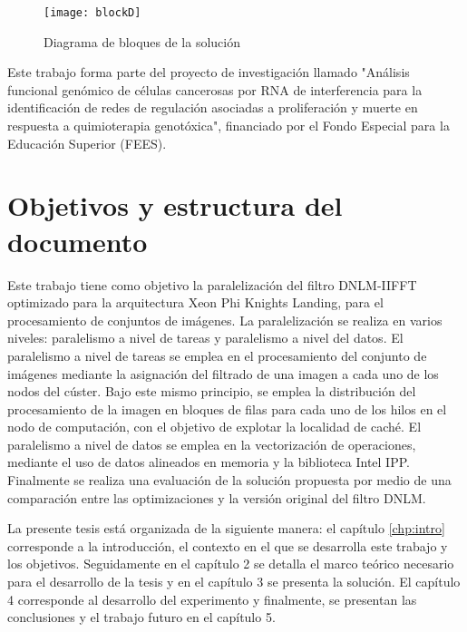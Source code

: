 \begin{figure}[H]
  \centering
  \texttt{[image: blockD]}
  \caption{Diagrama de bloques de la soluci\'on}
  \label{fig:diagram1}
\end{figure}

Este trabajo forma parte del proyecto de investigaci\'on llamado "Análisis funcional genómico de células cancerosas por RNA de interferencia para la identificación de redes de regulación asociadas a proliferación y muerte en respuesta a quimioterapia genotóxica", financiado por el Fondo Especial para la Educaci\'on Superior (FEES).


\section{Objetivos y estructura del documento}


Este trabajo tiene como objetivo la paralelizaci\'on del filtro DNLM-IIFFT optimizado para la arquitectura Xeon Phi Knights Landing, para el procesamiento de conjuntos de im\'agenes. La paralelizaci\'on se realiza en varios niveles: paralelismo a nivel de tareas y paralelismo a nivel del datos. El paralelismo a nivel de tareas se emplea en el procesamiento del conjunto de im\'agenes mediante la asignaci\'on del filtrado de una imagen a cada uno de los nodos del c\'uster. Bajo este mismo principio, se emplea la distribuci\'on del procesamiento de la imagen en bloques de filas para cada uno de los hilos en el nodo de computaci\'on, con el objetivo de explotar la localidad de cach\'e. El paralelismo a nivel de datos se emplea en la vectorizaci\'on de operaciones, mediante el uso de datos alineados en memoria y la biblioteca Intel IPP. Finalmente se realiza una evaluaci\'on de la soluci\'on propuesta por medio de una comparaci\'on entre las optimizaciones y la versi\'on original del filtro DNLM.


La presente tesis est\'a organizada de la siguiente manera: el cap\'itulo \ref{chp:intro} corresponde a la introducci\'on, el contexto en el que se desarrolla este trabajo y los objetivos. Seguidamente en el cap\'itulo 2 se detalla el marco te\'orico necesario para el desarrollo de la tesis y en el cap\'itulo 3 se presenta la soluci\'on. El cap\'itulo 4 corresponde al desarrollo del experimento y finalmente, se presentan las conclusiones y el trabajo futuro en el cap\'itulo 5. 


%

